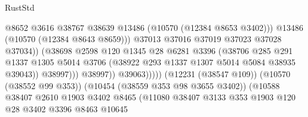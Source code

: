 \begin{lexlean}{RustStd}
\begin{coremodule}
                                                    @8652
                                                    @3616
                                                    @38767
                                                    @38639
                                                    @13486
                                                    (@10570 (@12384 @8653 @3402)))
                                                  @13486
                                                  (@10570 (@12384 @8643 @8659)))
                                                @37013
                                                @37016
                                                @37019
                                                @37023
                                                @37028
                                                @37034))
                                            (@38698
                                              @2598
                                              @120
                                              @1345
                                              @28
                                              @6281
                                              @3396
                                              (@38706
                                                @285
                                                @291
                                                @1337
                                                @1305
                                                @5014
                                                @3706
                                                (@38922 @293 @1337 @1307 @5014 @5084 @38935 @39043))
                                              @38997)))
                                        @38997))
                                    @39063)))))
                          (@12231 (@38547 @109))
                          (@10570 (@38552 @99 @353))
                          (@10454 (@38559 @353 @98 @3655 @3402))
                          (@10588
                            @38407
                            @2610
                            @1903
                            @3402
                            @8465
                            (@11080
                              @38407
                              @3133
                              @353
                              @1903
                              @120
                              @28
                              @3402
                              @3396
                              @8463
                              @10645

\end{coremodule}
\end{lexlean}
